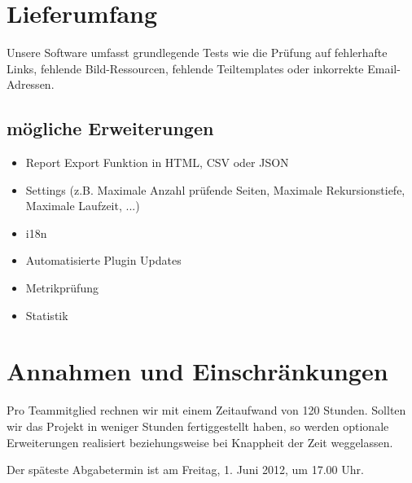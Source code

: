 \section{Lieferumfang}
Unsere Software umfasst grundlegende Tests wie die Prüfung auf fehlerhafte Links, fehlende Bild-Ressourcen, fehlende Teiltemplates oder inkorrekte Email-Adressen.

\subsection{mögliche Erweiterungen}
\begin{itemize}
	\setlength{\itemsep}{-\parsep}
 \item Report Export Funktion in \ac{HTML}, \ac{CSV} oder \ac{JSON}
 \item Settings (z.B. Maximale Anzahl prüfende Seiten, Maximale Rekursionstiefe, Maximale Laufzeit, ...)
 \item \ac{i18n}
 \item Automatisierte Plugin Updates
 \item Metrikprüfung
 \item Statistik
\end{itemize}
\section{Annahmen und Einschränkungen}
Pro Teammitglied rechnen wir mit einem Zeitaufwand von 120 Stunden. Sollten wir das Projekt in weniger Stunden fertiggestellt haben, so werden optionale Erweiterungen realisiert beziehungsweise bei Knappheit der Zeit weggelassen.

Der späteste Abgabetermin ist am Freitag, 1. Juni 2012, um 17.00 Uhr.
